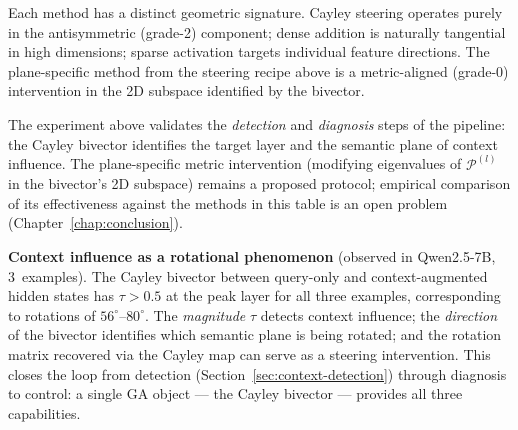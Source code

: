 \documentclass[11pt, twoside, openright]{memoir}
\newcommand{\metric}[1]{\mathcal{P}^{(#1)}} %
\numberwithin{equation}{chapter}
\begin{document}
Each method has a distinct geometric signature.  Cayley steering
operates purely in the antisymmetric (grade-2) component; dense
addition is naturally tangential in high dimensions; sparse
activation targets individual feature directions.  The
plane-specific method from the steering recipe above is a
metric-aligned (grade-0) intervention in the 2D subspace
identified by the bivector.

The experiment above validates the \emph{detection} and
\emph{diagnosis} steps of the pipeline: the Cayley bivector
identifies the target layer and the semantic plane of context
influence.  The plane-specific metric intervention (modifying
eigenvalues of $\metric{l}$ in the bivector's 2D subspace)
remains a proposed protocol; empirical comparison of its
effectiveness against the methods in this table is an open
problem (Chapter~\ref{chap:conclusion}).

\begin{finding}
\textbf{Context influence as a rotational phenomenon} (observed in
Qwen2.5-7B, 3~examples).
The Cayley bivector between query-only and context-augmented hidden
states has $\tau > 0.5$ at the peak layer for all three examples,
corresponding to rotations of $56^\circ$--$80^\circ$.  The
\emph{magnitude} $\tau$ detects context influence; the
\emph{direction} of the bivector identifies which semantic plane is
being rotated; and the rotation matrix recovered via the Cayley map
can serve as a steering intervention.  This closes the loop from
detection (Section~\ref{sec:context-detection}) through diagnosis
to control: a single GA object --- the Cayley bivector --- provides
all three capabilities.
\end{finding}
\end{document}
